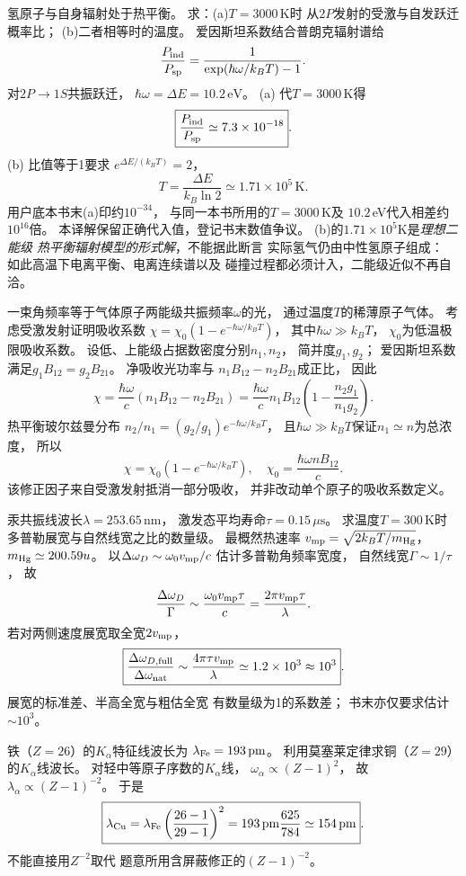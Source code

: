 氢原子与自身辐射处于热平衡。
求：(a)$T=3000\,\mathrm K$时
从$2P$发射的受激与自发跃迁概率比；
(b)二者相等时的温度。
\exsolution
爱因斯坦系数结合普朗克辐射谱给
\[
 \frac{P_{\rm ind}}{P_{\rm sp}}=
 \frac1{\exp(\hbar\omega/k_BT)-1}.
\]
对$2P\to1S$共振跃迁，
$\hbar\omega=\Delta E=10.2\,\mathrm{eV}$。
(a) 代$T=3000\,\mathrm K$得
\[
 \boxed{\frac{P_{\rm ind}}{P_{\rm sp}}
 \simeq7.3\times10^{-18}}.
\]
(b) 比值等于1要求
$e^{\Delta E/(k_BT)}=2$，
\[
 \boxed{T=\frac{\Delta E}{k_B\ln2}
 \simeq1.71\times10^5\,\mathrm K}.
\]
\excheck 用户底本书末(a)印约$10^{-34}$，
与同一本书所用的$T=3000\,$K及
$10.2\,$eV代入相差约$10^{16}$倍。
本译解保留正确代入值，登记书末数值争议。
(b)的$1.71\times10^5$K是\emph{理想二能级
热平衡辐射模型的形式解}，不能据此断言
实际氢气仍由中性氢原子组成：
如此高温下电离平衡、电离连续谱以及
碰撞过程都必须计入，二能级近似不再自洽。

一束角频率等于气体原子两能级共振频率$\omega$的光，
通过温度$T$的稀薄原子气体。
考虑受激发射证明吸收系数
$\chi=\chi_0(1-e^{-\hbar\omega/k_BT})$，
其中$\hbar\omega\gg k_BT$，
$\chi_0$为低温极限吸收系数。
\exsolution
设低、上能级占据数密度分别$n_1,n_2$，
简并度$g_1,g_2$；
爱因斯坦系数满足$g_1B_{12}=g_2B_{21}$。
净吸收光功率与
$n_1B_{12}-n_2B_{21}$成正比，
因此
\[
 \chi=\frac{\hbar\omega}{c}
 (n_1B_{12}-n_2B_{21})
 =\frac{\hbar\omega}{c}n_1B_{12}
 \left(1-\frac{n_2g_1}{n_1g_2}\right).
\]
热平衡玻尔兹曼分布
$n_2/n_1=(g_2/g_1)e^{-\hbar\omega/k_BT}$，
且$\hbar\omega\gg k_BT$保证$n_1\simeq n$为总浓度，
所以
\[
 \boxed{\chi=\chi_0(1-e^{-\hbar\omega/k_BT})},
 \quad\chi_0=\frac{\hbar\omega nB_{12}}c.
\]
\excheck 该修正因子来自受激发射抵消一部分吸收，
并非改动单个原子的吸收系数定义。

汞共振线波长$\lambda=253.65\,\mathrm{nm}$，
激发态平均寿命$\tau=0.15\,\mu\mathrm s$。
求温度$T=300\,\mathrm K$时
多普勒展宽与自然线宽之比的数量级。
\exsolution
最概然热速率
$v_{\rm mp}=\sqrt{2k_BT/m_{\rm Hg}}$，
$m_{\rm Hg}\simeq200.59u$。
以$\Delta\omega_D\sim\omega_0v_{\rm mp}/c$
估计多普勒角频率宽度，
自然线宽$\Gamma\sim1/\tau$，
故
\[
 \frac{\Delta\omega_D}{\Gamma}
 \sim\frac{\omega_0v_{\rm mp}\tau}{c}
 =\frac{2\pi v_{\rm mp}\tau}{\lambda}.
\]
若对两侧速度展宽取全宽$2v_{\rm mp}$，
\[
 \boxed{\frac{\Delta\omega_{D,\mathrm{full}}}
 {\Delta\omega_{\mathrm{nat}}}
 \sim\frac{4\pi\tau v_{\rm mp}}{\lambda}
 \simeq1.2\times10^3\approx10^3}.
\]
\excheck 展宽的标准差、半高全宽与粗估全宽
有数量级为1的系数差；
书末亦仅要求估计$\sim10^3$。

铁（$Z=26$）的$K_\alpha$特征线波长为
$\lambda_{\rm Fe}=193\,\mathrm{pm}$。
利用莫塞莱定律求铜（$Z=29$）
的$K_\alpha$线波长。
\exsolution
对轻中等原子序数的$K_\alpha$线，
$\omega_\alpha\propto(Z-1)^2$，
故$\lambda_\alpha\propto(Z-1)^{-2}$。
于是
\[
 \boxed{\lambda_{\rm Cu}=
 \lambda_{\rm Fe}\left(\frac{26-1}{29-1}\right)^2
 =193\,\mathrm{pm}\frac{625}{784}
 \simeq154\,\mathrm{pm}}.
\]
\excheck 不能直接用$Z^{-2}$取代
题意所用含屏蔽修正的$(Z-1)^{-2}$。

